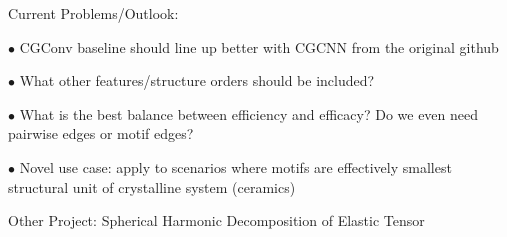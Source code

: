 \documentclass[11pt]{beamer}
\begin{document}
\begin{frame}
Current Problems/Outlook:

\medskip

$\bullet$ CGConv baseline should line up better with CGCNN from the original github

\medskip

$\bullet$ What other features/structure orders should be included?

\medskip

$\bullet$ What is the best balance between efficiency and efficacy? Do we even need pairwise edges or motif edges?

\medskip 

$\bullet$ Novel use case: apply to scenarios where motifs are effectively smallest structural unit of crystalline system (ceramics)
\end{frame}

\begin{frame}{{\small Other Project:} Spherical Harmonic Decomposition of Elastic Tensor}

\end{frame}
\end{document}
